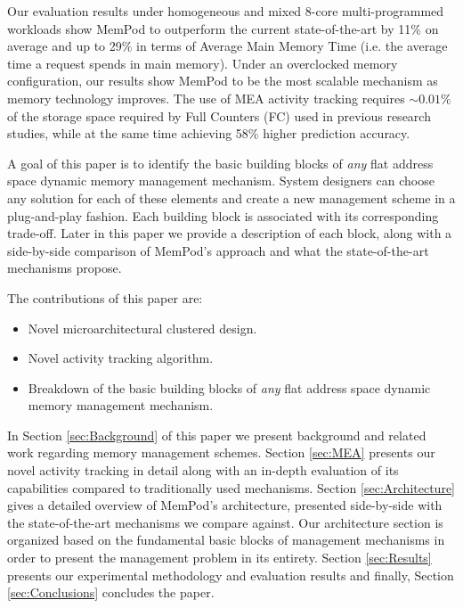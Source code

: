 Our evaluation results under homogeneous and mixed 8-core multi-programmed workloads show MemPod to outperform the current state-of-the-art by 11\% on average and up to 29\% in terms of Average Main Memory Time (i.e. the average time a request spends in main memory). Under an overclocked memory configuration, our results show MemPod to be the most scalable mechanism as memory technology improves. The use of MEA activity tracking requires $\sim0.01\%$ of the storage space required by Full Counters (FC) used in previous research studies, while at the same time achieving 58\% higher prediction accuracy.

A goal of this paper is to identify the basic building blocks of \emph{any} flat address space dynamic memory management mechanism. System designers can choose any solution for each of these elements and create a new management scheme in a plug-and-play fashion. Each building block is associated with its corresponding trade-off. Later in this paper we provide a description of each block, along with a side-by-side comparison of MemPod's approach and what the state-of-the-art mechanisms propose.

The contributions of this paper are:

\begin{itemize}
\item Novel microarchitectural clustered design.
\item Novel activity tracking algorithm.
\item Breakdown of the basic building blocks of \emph{any} flat address space dynamic memory management mechanism. 
\end{itemize}

In Section \ref{sec:Background} of this paper we present background and related work regarding memory management schemes. Section \ref{sec:MEA} presents our novel activity tracking in detail along with an in-depth evaluation of its capabilities compared to traditionally used mechanisms. Section \ref{sec:Architecture} gives a detailed overview of MemPod's architecture, presented side-by-side with the state-of-the-art mechanisms we compare against. Our architecture section is organized based on the fundamental basic blocks of management mechanisms in order to present the management problem in its entirety. Section \ref{sec:Results} presents our experimental methodology and evaluation results and finally, Section \ref{sec:Conclusions} concludes the paper.